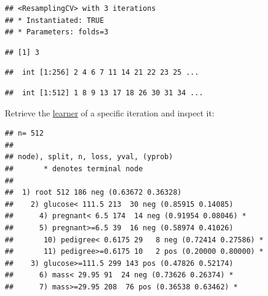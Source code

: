 \documentclass[]{scrbook}
\newenvironment{Shaded}{\begin{snugshade}}{\end{snugshade}}
\newcommand{\DecValTok}[1]{\textcolor[rgb]{0.00,0.00,0.81}{#1}}
\newcommand{\KeywordTok}[1]{\textcolor[rgb]{0.13,0.29,0.53}{\textbf{#1}}}
\newcommand{\NormalTok}[1]{#1}
\newcommand{\OperatorTok}[1]{\textcolor[rgb]{0.81,0.36,0.00}{\textbf{#1}}}
\newcommand{\StringTok}[1]{\textcolor[rgb]{0.31,0.60,0.02}{#1}}
\renewenvironment{Shaded} {\begin{snugshade}\small} {\end{snugshade}}
\begin{document}
\begin{verbatim}
## <ResamplingCV> with 3 iterations
## * Instantiated: TRUE
## * Parameters: folds=3
\end{verbatim}

\begin{Shaded}
\end{Shaded}

\begin{verbatim}
## [1] 3
\end{verbatim}

\begin{Shaded}
\end{Shaded}

\begin{verbatim}
##  int [1:256] 2 4 6 7 11 14 21 22 23 25 ...
\end{verbatim}

\begin{Shaded}
\end{Shaded}

\begin{verbatim}
##  int [1:512] 1 8 9 13 17 18 26 30 31 34 ...
\end{verbatim}

Retrieve the \protect\hyperlink{learners}{learner} of a specific iteration and inspect it:

\begin{Shaded}
\end{Shaded}

\begin{verbatim}
## n= 512 
## 
## node), split, n, loss, yval, (yprob)
##       * denotes terminal node
## 
##  1) root 512 186 neg (0.63672 0.36328)  
##    2) glucose< 111.5 213  30 neg (0.85915 0.14085)  
##      4) pregnant< 6.5 174  14 neg (0.91954 0.08046) *
##      5) pregnant>=6.5 39  16 neg (0.58974 0.41026)  
##       10) pedigree< 0.6175 29   8 neg (0.72414 0.27586) *
##       11) pedigree>=0.6175 10   2 pos (0.20000 0.80000) *
##    3) glucose>=111.5 299 143 pos (0.47826 0.52174)  
##      6) mass< 29.95 91  24 neg (0.73626 0.26374) *
##      7) mass>=29.95 208  76 pos (0.36538 0.63462) *
\end{verbatim}
\end{document}
